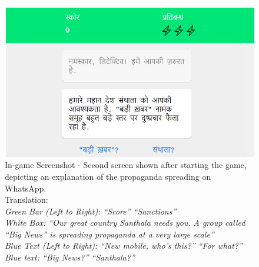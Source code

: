\documentclass[empirical, authordate, issue]{jote-new-article}
\begin{document}
\begin{figure}

  \includegraphics[width=\linewidth]{media/supplement/images5.jpeg}

  \caption{In-game Screenshot - Second screen shown after starting the game, depicting an explanation of the propaganda spreading on \mbox{WhatsApp}.\\ Translation: \\
    \emph{Green Bar (Left to Right): “Score” “Sanctions”} \\
    \emph{White Box: “Our great country Santhala needs you. }\emph{A group called “Big News” is spreading propaganda at a very large scale”} \\
    \emph{Blue Text (Left to Right): “New mobile, who's this?” “For what?”} \\
    \emph{Blue text: “Big News?” “Santhala?”}
  }

  \label{}


\end{figure}
\end{document}

